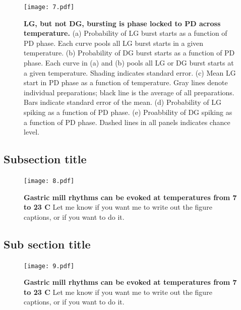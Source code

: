 \documentclass[9pt,lineno]{elife}
\begin{document}
\begin{figure}[!htp]
\centering
\begin{fullwidth}
\texttt{[image: 7.pdf]}
\end{fullwidth}
\caption{\textbf{LG, but not DG, bursting is phase locked to PD across temperature.} (a) Probability of LG burst starts as a function of PD phase. Each curve pools all LG burst starts in a given temperature.  (b) Probability of DG burst starts as a function of PD phase. Each curve in (a) and (b) pools all LG or DG burst starts at a given temperature. Shading indicates standard error.  (c) Mean LG start in PD phase as a function of temperature. Gray lines denote individual preparations; black line is the average of all preparations. Bars indicate standard error of the mean. (d) Probability of LG spiking as a function of PD phase. (e) Proabbility of DG spiking as a function of PD phase.  Dashed lines in all panels indicates chance level.}
\end{figure}


\lipsum[1]

\subsection{Subsection title}

\lipsum[2]


\begin{figure}
\begin{fullwidth}
\texttt{[image: 8.pdf]}

\caption{\textbf{Gastric mill rhythms can be evoked at temperatures from 7 to 23 C } Let me know if you want me to write out the figure captions, or if you want to do it.   } 
\label{fig:8}
\end{fullwidth}
\end{figure}


\subsection{Sub section title}

\lipsum[2]


\begin{figure}
\begin{fullwidth}
\texttt{[image: 9.pdf]}

\caption{\textbf{Gastric mill rhythms can be evoked at temperatures from 7 to 23 C } Let me know if you want me to write out the figure captions, or if you want to do it.   } 
\label{fig:9}
\end{fullwidth}
\end{figure}
\end{document}
